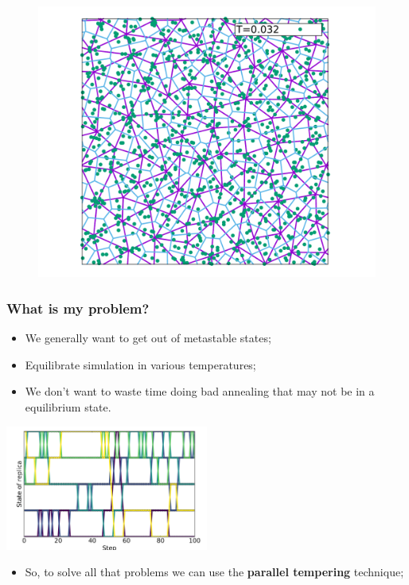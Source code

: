 \documentclass{beamer}
\begin{document}
\begin{frame}
\begin{figure}
    \includegraphics[scale=0.17]{Imagens/T0032.pdf}
  \end{figure}
\end{frame}

\begin{frame}
  \frametitle{What is my problem?}
  \begin{itemize}
  \item We generally want to get out of metastable states;
  \item Equilibrate simulation in various temperatures;
  \item We don't want to waste time doing bad annealing that may not be in a equilibrium state.
  \end{itemize}

  \begin{center}
    \includegraphics[width=0.5\textwidth]{Imagens/pt.png}
  \end{center}

  \begin{itemize}
  \item So, to solve all that problems we can use the \textbf{parallel tempering} technique;
  \end{itemize}
\end{frame}
\end{document}
